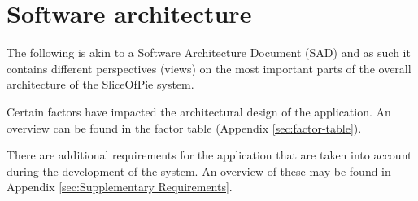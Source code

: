 \section{Software architecture}

The following is akin to a Software Architecture Document (SAD) \cite[p.~655-659]{Larman2011} and as such
it contains different perspectives (views) on the most important parts of the overall architecture
of the SliceOfPie system.

Certain factors have impacted the architectural design of the application. An overview can be found in the factor
table (Appendix \ref{sec:factor-table}).

There are additional requirements for the application that are taken into account during the development
of the system. An overview of these may be found in Appendix \ref{sec:Supplementary Requirements}.















